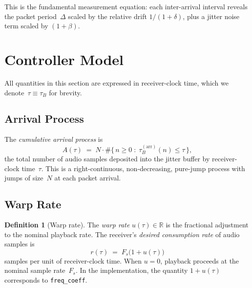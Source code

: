 \documentclass[11pt, a4paper]{article}
\theoremstyle{definition}
\newtheorem{definition}{Definition}[section]
\theoremstyle{plain}
\theoremstyle{remark}
\newcommand{\R}{\mathbb{R}}
\begin{document}
This is the fundamental measurement equation: each inter-arrival
interval reveals the packet period~$\Delta$ scaled by the relative drift
$1/(1+\delta)$, plus a jitter noise term scaled by $(1+\beta)$.

\section{Controller Model}\label{sec:controller-model}

All quantities in this section are expressed in receiver-clock
time, which we denote~$\tau \equiv \tau_B$ for brevity.

\subsection{Arrival Process}\label{sec:arrival-process}

The \emph{cumulative arrival process} is
\begin{equation}\label{eq:arrival-process}
  A(\tau) \;=\; N \cdot \#\bigl\{\,n \ge 0 \;:\;
    \tau_B^{(\text{arr})}(n) \le \tau\,\bigr\},
\end{equation}
the total number of audio samples deposited into the jitter buffer by
receiver-clock time~$\tau$.  This is a right-continuous, non-decreasing,
pure-jump process with jumps of size~$N$ at each packet arrival.

\subsection{Warp Rate}\label{sec:warp-rate}

\begin{definition}[Warp rate]\label{def:warp}
  The \emph{warp rate} $u(\tau) \in \R$ is the fractional adjustment
  to the nominal playback rate.  The receiver's \emph{desired
  consumption rate} of audio samples is
  \begin{equation}\label{eq:playback-rate}
    r(\tau) \;=\; F_s\bigl(1 + u(\tau)\bigr)
  \end{equation}
  samples per unit of receiver-clock time.
  When $u = 0$, playback proceeds at the nominal sample rate~$F_s$.
  In the implementation, the quantity $1 + u(\tau)$ corresponds to
  \texttt{freq\_coeff}.
\end{definition}
\end{document}
